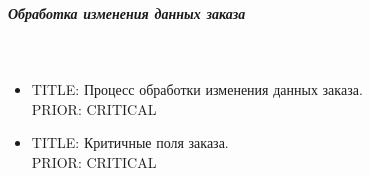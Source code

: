 \subparagraph{Обработка изменения данных заказа} \mbox{}\\ \label{change_order_processor} 

  \begin{itemize}

   \item {
      TITLE: Процесс обработки изменения данных заказа.
      \\
      PRIOR: CRITICAL\\
   }

   \item {
    TITLE: Критичные поля заказа.
     \\ 
      PRIOR: CRITICAL\\   
   }

   \end{itemize}

